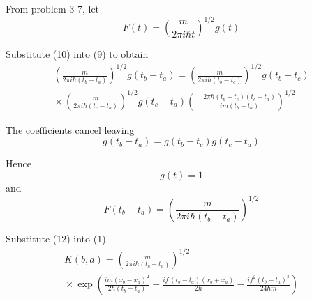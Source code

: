 \documentclass[12pt]{article}
\begin{document}
From problem 3-7, let
\begin{equation*}
F(t)=\left(\frac{m}{2\pi i\hbar t}\right)^{1/2} g(t)
\tag{10}
\end{equation*}

Substitute (10) into (9) to obtain
\begin{multline*}
\left(\frac{m}{2\pi i\hbar(t_b-t_a)}\right)^{1/2} g(t_b-t_a)
=\left(\frac{m}{2\pi i\hbar(t_b-t_c)}\right)^{1/2} g(t_b-t_c)
\\
{}\times
\left(\frac{m}{2\pi i\hbar(t_c-t_a)}\right)^{1/2} g(t_c-t_a)
\left(-\frac{2\pi\hbar(t_b-t_c)(t_c-t_a)}{im(t_b-t_a)}\right)^{1/2}
\end{multline*}

The coefficients cancel leaving
\begin{equation*}
g(t_b-t_a)=g(t_b-t_c)g(t_c-t_a)
\tag{11}
\end{equation*}

Hence
\begin{equation*}
g(t)=1
\end{equation*}
and
\begin{equation*}
F(t_b-t_a)=\left(\frac{m}{2\pi i\hbar(t_b-t_a)}\right)^{1/2}
\tag{12}
\end{equation*}

Substitute (12) into (1).
\begin{multline*}
K(b,a)=\left(\frac{m}{2\pi i\hbar(t_b-t_a)}\right)^{1/2}
\\
{}\times\exp\left(
\frac{im(x_b-x_a)^2}{2\hbar(t_b-t_a)}
+\frac{if\,(t_b-t_a)(x_b+x_a)}{2\hbar}
-\frac{if^2(t_b-t_a)^3}{24\hbar m}
\right)
\end{multline*}
\end{document}
